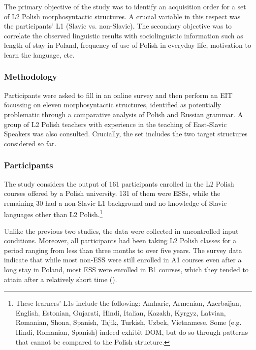 \documentclass[output=paper,            colorlinks, citecolor=brown            		  ]{langscibook}
\begin{document}
The primary objective of the study was to identify an acquisition order for a set of L2 Polish morphosyntactic structures. A crucial variable in this respect was the participants’ L1 (Slavic vs. non-Slavic). The secondary objective was to correlate the observed linguistic results with sociolinguistic information such as length of stay in Poland, frequency of use of Polish in everyday life, motivation to learn the language, etc. 

\subsubsection{Methodology}\label{sec:saturno:3.4.1}

Participants were asked to fill in an online survey and then perform an EIT focussing on eleven morphosyntactic structures, identified as potentially problematic through a comparative analysis of Polish and Russian grammar. A group of L2 Polish teachers with experience in the teaching of East-Slavic Speakers was also consulted. Crucially, the set includes the two target structures considered so far. 

\subsubsection{Participants}\label{sec:saturno:3.4.2}

The study considers the output of 161 participants enrolled in the L2 Polish cour\-ses offered by a Polish university. 131 of them were ESSs, while the remaining 30 had a non-Slavic L1 background and no knowledge of Slavic languages other than L2 Polish.\footnote{{These learners’ L1s include the following: Amharic, Armenian, Azerbaijan, English, Estonian, Gujarati, Hindi, Italian, Kazakh, Kyrgyz, Latvian, Romanian, Shona, Spanish, Tajik, Turkish, Uzbek, Vietnamese. Some (e.g. Hindi, Romanian, Spanish) indeed exhibit DOM, but do so through patterns that cannot be compared to the Polish structure.}}

Unlike the previous two studies, the data were collected in uncontrolled input conditions. Moreover, all participants had been taking L2 Polish classes for a period ranging from less than three months to over five years. The survey data indicate that while most non-ESS were still enrolled in A1 courses even after a long stay in Poland, most ESS were enrolled in B1 courses, which they tended to attain after a relatively short time (). 
\end{document}
